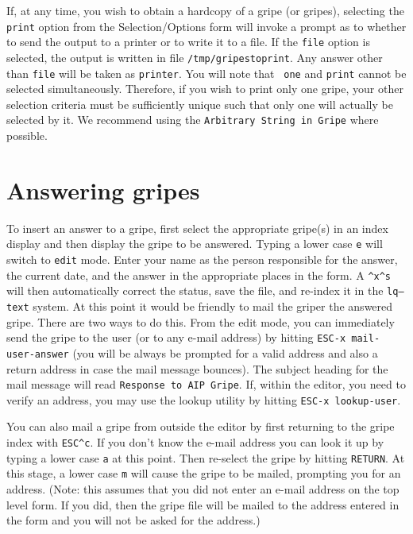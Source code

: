 If, at any time, you wish to obtain a hardcopy of a gripe (or gripes),
selecting the {\tt print} option from the Selection/Options form will
invoke a prompt as to whether to send the output to a printer or to
write it to a file.  If the {\tt file} option is selected, the output
is written in file {\tt /tmp/gripestoprint}.  Any answer other than
{\tt file} will be taken as {\tt printer}. You will note that {\tt
one} and {\tt print} cannot be selected simultaneously.  Therefore, if
you wish to print only one gripe, your other selection criteria must
be sufficiently unique such that only one will actually be selected by
it. We recommend using the {\tt Arbitrary String in Gripe} where
possible.

\section{Answering gripes}

To insert an answer to a gripe, first select the appropriate gripe(s)
in an index display and then display the gripe to be answered.  Typing
a lower case {\tt e} will switch to {\tt edit} mode.  Enter your name
as the person responsible for the answer, the current date, and the
answer in the appropriate places in the form.  A {\tt \^{ }x\^{ }s}
will then automatically correct the status, save the file, and
re-index it in the {\tt lq--text} system.  At this point it would be
friendly to mail the griper the answered gripe.  There are two ways to
do this. From the edit mode, you can immediately send the gripe to the
user (or to any e-mail address) by hitting {\tt ESC-x
mail-user-answer} (you will be always be prompted for a valid address
and also a return address in case the mail message bounces).  The
subject heading for the mail message will read {\tt Response to AIP
Gripe}.  If, within the editor, you need to verify an address, you may
use the lookup utility by hitting {\tt ESC-x lookup-user}.

You can also mail a gripe from outside the editor by first returning
to the gripe index with {\tt ESC\^{ }c}.  If you don't know the
e-mail address you can look it up by typing a lower case {\tt a} at
this point.  Then re-select the gripe by hitting \hbox{{\tt RETURN}}.
At this stage, a lower case {\tt m} will cause the gripe to be mailed,
prompting you for an address.  (Note: this assumes that you did not
enter an e-mail address on the top level form.  If you did, then the
gripe file will be mailed to the address entered in the form and you
will not be asked for the address.)

